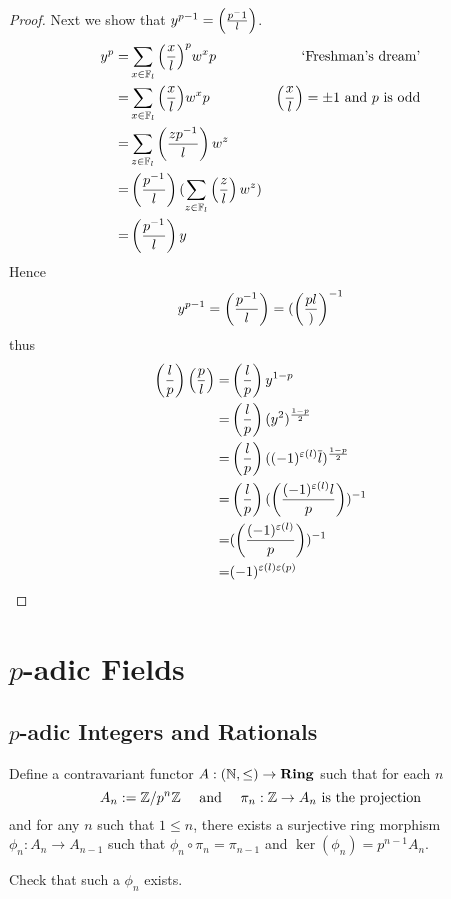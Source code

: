 \begin{proof}
    Next we show that $y^{p - 1} = \left(\frac{p^-1}{l}\right)$.
    \begin{align*}
        y^p = & \sum_{x \in \mathbb{F}_l} {\left(\frac{x}{l}\right)}^p w^xp & \text{ `Freshman's dream'}\\
            = & \sum_{x \in \mathbb{F}_l} {\left(\frac{x}{l}\right)} w^xp & 
            \left(\frac{x}{l}\right)= \pm 1 \text{ and } p \text{ is odd}\\
            = & \sum_{z \in \mathbb{F}_l} \left(\frac{z p^{-1}}{l}\right) w^z\\
            = & \left(\frac{p^{-1}}{l}\right)(\sum_{z \in \mathbb{F}_l} \left(\frac{z}{l}\right) w^z)\\
            = & \left(\frac{p^{-1}}{l}\right) y
    \end{align*}
    Hence \[y^{p - 1} = \left(\frac{p^{-1}}{l}\right) = (\left(\frac{p{l}}{)}\right)^{-1}\]
    thus 
    \begin{align*}
        \left(\frac{l}{p}\right)\left(\frac{p}{l}\right) =& \left(\frac{l}{p}\right) y^{1 - p}\\
        =& \left(\frac{l}{p}\right) (y^2)^{\frac{1 - p}{2}}\\
        =& \left(\frac{l}{p}\right) ((-1)^{\varepsilon(l)} \overline{l})^{\frac{1 - p}{2}}\\
        =& \left(\frac{l}{p}\right) (\left(\frac{(-1)^{\varepsilon(l)}l}{p}\right))^{-1}\\
        =& (\left(\frac{(-1)^{\varepsilon(l)}}{p}\right))^{-1}\\
        =& (-1)^{\varepsilon(l)\varepsilon(p)}
    \end{align*}
\end{proof}




\chapter{$p$-adic Fields}
\section{$p$-adic Integers and Rationals}
\begin{dfn}
    Define a contravariant functor $A : (\mathbb{N},\le) \to \mathbf{Ring}$ 
    such that for each $n$
    \[A_n := \mathbb{Z} / p^n \mathbb{Z} \quad \text{ and } 
    \quad \pi_n : \mathbb{Z} \to A_n \text{ is the projection}\]
    and for any $n$ such that $1 \le n$, 
    there exists a surjective ring morphism 
    $\phi_n : A_n \to A_{n-1}$ such that
    $\phi_n \circ \pi_n = \pi_{n-1}$ and 
    $\ker(\phi_n) = p^{n-1} A_n$.
\end{dfn}
\begin{ex}
    Check that such a $\phi_n$ exists.
\end{ex}

